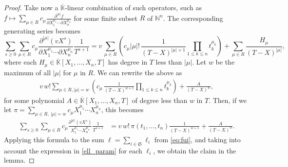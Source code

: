 \documentclass[final,1p,times,authoryear]{elsarticle}
\newcommand{\lf}{X}
\def\N {\ensuremath{\mathbb{N}}}
\def\Kbar {{\ensuremath{\overline{\mathbb{K}}}}}
\begin{document}
\begin{proof}
  Take now a $\Kbar$-linear combination of such operators, such as $f \mapsto
  \sum_{\mu \in R} c_\mu \frac{ \partial^{|\mu|} f } {\partial
  X_1^{\mu_1} \cdots \partial X_n^{\mu_n}}$ for some finite subset $R$ of
  $\N^n$. The corresponding generating series becomes
  \[
    \sum_{s \ge 0} \sum_{\mu \in R} c_\mu \frac{ \partial^{|\mu|} ( v
    \lf^s )} {\partial X_1^{\mu_1} \cdots \partial X_n^{\mu_n}}
    \frac{1}{T^{s+1}} = v\,\sum_{\mu \in R} \left( c_\mu |\mu|!\,  \frac {1}{(T-\lf )^{|\mu|+1}} \prod_{1
      \le k \le n} t_k^{\mu_k} \right )+\sum_{\mu
    \in R} \frac{H_\mu}{(T-\lf)^{|\mu|}},
  \]
  where each $H_\mu \in \Kbar[X_1,\dots,X_n,T]$ has degree in $T$ less than
  $|\mu|$.  Let $w$ be the maximum of all $|\mu|$ for $\mu$ in
  $R$. We can rewrite the above as
  \begin{align*}
    v\, w! 
    \sum_{\mu \in R, |\mu|=w}\left ( c_\mu
      \,    \frac {1}{(T-\lf )^{w+1}} \prod_{1 \le k \le n} 
    t_k^{\mu_k}\right )
    + \frac{A}{(T-\lf )^{w}},
  \end{align*}
  for some polynomial $A \in \Kbar[X_1,\dots,X_n,T]$ of degree less than $w$ in $T$. 
  Then, if we let 
  $\pi =\sum_{\mu \in R,\ |\mu|=w} c_{\mu} X_1^{\mu_1} \cdots
  X_n^{\mu_n}$, this becomes
  \begin{align*}
    \sum_{s \ge 0} 
    \sum_{\mu \in R} c_\mu \frac{ \partial^{|\mu|} ( v \lf^s )} { X_1^{\mu_1} \cdots
    X_n^{\mu_n}}
    \frac{1}{T^{s+1}} 
    &=
    v\, w! \,  \pi(t_1,\dots,t_n)
    \frac {1}{(T-\lf )^{w+1}}
    + \frac{A}{(T-\lf )^{w}}.
  \end{align*}
  Applying this formula to the sum $\ell=\sum_{i \in
  \mathfrak{S}}\ell_i$ from \cref{eq:fui}, and taking into account
  the expression in \cref{ell_param} for each $\ell_i$, we obtain the
  claim in the lemma.
\end{proof}

\end{document}
